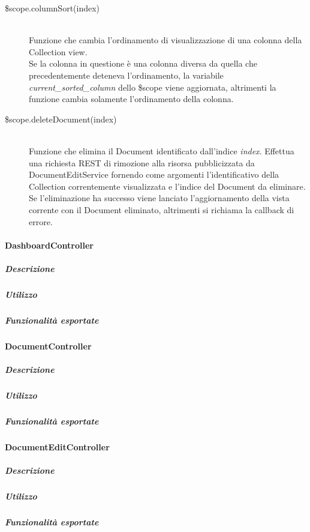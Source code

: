 \begin{description}
 \item[\$scope.columnSort(index)] \hfill \\
 Funzione che cambia l'ordinamento di visualizzazione di una colonna della Collection view. \\
 Se la colonna in questione è una colonna diversa da quella che precedentemente deteneva l'ordinamento,
 la variabile \emph{current\_sorted\_column} dello \$scope viene aggiornata, altrimenti la funzione cambia solamente
 l'ordinamento della colonna.
 
 \item[\$scope.deleteDocument(index)] \hfill \\
 Funzione che elimina il Document identificato dall'indice \emph{index}. Effettua una richiesta REST di rimozione alla risorsa
 pubblicizzata da DocumentEditService fornendo come argomenti l'identificativo della Collection correntemente visualizzata e l'indice
 del Document da eliminare. \\
 Se l'eliminazione ha successo viene lanciato l'aggiornamento della vista corrente con il Document eliminato, altrimenti si
 richiama la callback di errore.
 
 
\end{description}


\paragraph{DashboardController}
\subparagraph{Descrizione}

\subparagraph{Utilizzo}

\subparagraph{Funzionalità esportate}

\paragraph{DocumentController}
\subparagraph{Descrizione}

\subparagraph{Utilizzo}

\subparagraph{Funzionalità esportate}

\paragraph{DocumentEditController}
\subparagraph{Descrizione}

\subparagraph{Utilizzo}

\subparagraph{Funzionalità esportate}


